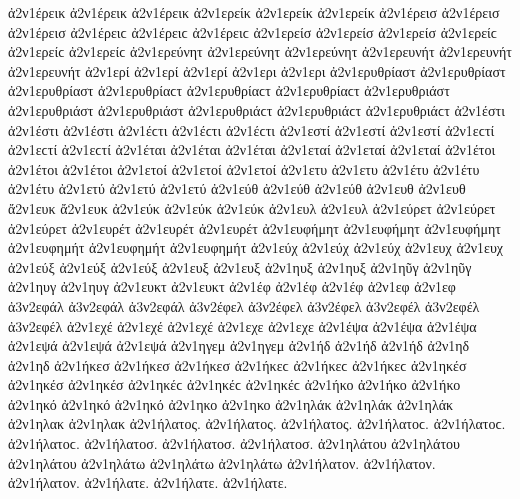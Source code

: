 {ἀ2ν1έρεικ ἀ2ν1έρεικ ἀ2ν1έρεικ   %
ἀ2ν1ερείκ ἀ2ν1ερείκ ἀ2ν1ερείκ 
ἀ2ν1έρεισ ἀ2ν1έρεισ ἀ2ν1έρεισ ἀ2ν1έρειϲ ἀ2ν1έρειϲ ἀ2ν1έρειϲ   %
ἀ2ν1ερείσ ἀ2ν1ερείσ ἀ2ν1ερείσ ἀ2ν1ερείϲ ἀ2ν1ερείϲ ἀ2ν1ερείϲ 
ἀ2ν1ερεύνητ ἀ2ν1ερεύνητ ἀ2ν1ερεύνητ   %
ἀ2ν1ερευνήτ ἀ2ν1ερευνήτ ἀ2ν1ερευνήτ 
ἀ2ν1ερί ἀ2ν1ερί ἀ2ν1ερί   %
ἀ2ν1ερι ἀ2ν1ερι 
ἀ2ν1ερυθρίαστ ἀ2ν1ερυθρίαστ ἀ2ν1ερυθρίαστ ἀ2ν1ερυθρίαϲτ ἀ2ν1ερυθρίαϲτ ἀ2ν1ερυθρίαϲτ   %
ἀ2ν1ερυθριάστ ἀ2ν1ερυθριάστ ἀ2ν1ερυθριάστ ἀ2ν1ερυθριάϲτ ἀ2ν1ερυθριάϲτ ἀ2ν1ερυθριάϲτ 
ἀ2ν1έστι ἀ2ν1έστι ἀ2ν1έστι ἀ2ν1έϲτι ἀ2ν1έϲτι ἀ2ν1έϲτι   %
ἀ2ν1εστί ἀ2ν1εστί ἀ2ν1εστί ἀ2ν1εϲτί ἀ2ν1εϲτί ἀ2ν1εϲτί 
ἀ2ν1έται ἀ2ν1έται ἀ2ν1έται   %
ἀ2ν1εταί ἀ2ν1εταί ἀ2ν1εταί 
ἀ2ν1έτοι ἀ2ν1έτοι ἀ2ν1έτοι   %
ἀ2ν1ετοί ἀ2ν1ετοί ἀ2ν1ετοί 
ἀ2ν1ετυ ἀ2ν1ετυ   %
ἀ2ν1έτυ ἀ2ν1έτυ ἀ2ν1έτυ   %
ἀ2ν1ετύ ἀ2ν1ετύ ἀ2ν1ετύ 
ἀ2ν1εύθ ἀ2ν1εύθ ἀ2ν1εύθ   %
ἀ2ν1ευθ ἀ2ν1ευθ 
ἄ2ν1ευκ ἄ2ν1ευκ   %
ἀ2ν1εύκ ἀ2ν1εύκ ἀ2ν1εύκ 
ἀ2ν1ευλ ἀ2ν1ευλ   %
ἀ2ν1εύρετ ἀ2ν1εύρετ ἀ2ν1εύρετ   %
ἀ2ν1ευρέτ ἀ2ν1ευρέτ ἀ2ν1ευρέτ 
ἀ2ν1ευφήμητ ἀ2ν1ευφήμητ ἀ2ν1ευφήμητ   %
ἀ2ν1ευφημήτ ἀ2ν1ευφημήτ ἀ2ν1ευφημήτ 
ἀ2ν1εύχ ἀ2ν1εύχ ἀ2ν1εύχ   %
ἀ2ν1ευχ ἀ2ν1ευχ 
ἀ2ν1εύξ ἀ2ν1εύξ ἀ2ν1εύξ   %
ἀ2ν1ευξ ἀ2ν1ευξ 
ἀ2ν1ηυξ ἀ2ν1ηυξ   %
ἀ2ν1ηῦγ ἀ2ν1ηῦγ   %
ἀ2ν1ηυγ ἀ2ν1ηυγ 
ἀ2ν1ευκτ ἀ2ν1ευκτ   %
ἀ2ν1έφ ἀ2ν1έφ ἀ2ν1έφ   %
ἀ2ν1εφ ἀ2ν1εφ 
ἀ3ν2εφάλ ἀ3ν2εφάλ ἀ3ν2εφάλ   %
ἀ3ν2έφελ ἀ3ν2έφελ ἀ3ν2έφελ   %
ἀ3ν2εφέλ ἀ3ν2εφέλ ἀ3ν2εφέλ 
ἀ2ν1εχέ ἀ2ν1εχέ ἀ2ν1εχέ   %
ἀ2ν1εχε ἀ2ν1εχε 
ἀ2ν1έψα ἀ2ν1έψα ἀ2ν1έψα   %
ἀ2ν1εψά ἀ2ν1εψά ἀ2ν1εψά 
ἀ2ν1ηγεμ ἀ2ν1ηγεμ   %
ἀ2ν1ήδ ἀ2ν1ήδ ἀ2ν1ήδ   %
ἀ2ν1ηδ ἀ2ν1ηδ 
ἀ2ν1ήκεσ ἀ2ν1ήκεσ ἀ2ν1ήκεσ ἀ2ν1ήκεϲ ἀ2ν1ήκεϲ ἀ2ν1ήκεϲ   %
ἀ2ν1ηκέσ ἀ2ν1ηκέσ ἀ2ν1ηκέσ ἀ2ν1ηκέϲ ἀ2ν1ηκέϲ ἀ2ν1ηκέϲ 
ἀ2ν1ήκο ἀ2ν1ήκο ἀ2ν1ήκο   %
ἀ2ν1ηκό ἀ2ν1ηκό ἀ2ν1ηκό 
ἀ2ν1ηκο ἀ2ν1ηκο 
ἀ2ν1ηλάκ ἀ2ν1ηλάκ ἀ2ν1ηλάκ   %
ἀ2ν1ηλακ ἀ2ν1ηλακ 
ἀ2ν1ήλατος. ἀ2ν1ήλατος. ἀ2ν1ήλατος. ἀ2ν1ήλατοϲ. ἀ2ν1ήλατοϲ. ἀ2ν1ήλατοϲ.   %
ἀ2ν1ήλατοσ. ἀ2ν1ήλατοσ. ἀ2ν1ήλατοσ. 
ἀ2ν1ηλάτου ἀ2ν1ηλάτου ἀ2ν1ηλάτου 
ἀ2ν1ηλάτω ἀ2ν1ηλάτω ἀ2ν1ηλάτω 
ἀ2ν1ήλατον. ἀ2ν1ήλατον. ἀ2ν1ήλατον. 
ἀ2ν1ήλατε. ἀ2ν1ήλατε. ἀ2ν1ήλατε. 
}
